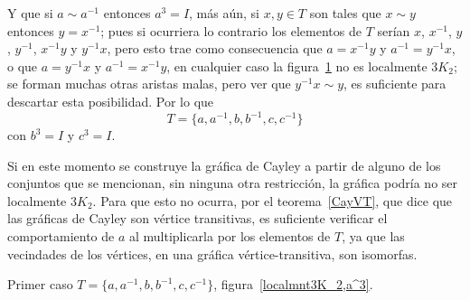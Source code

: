 \documentclass[12pt]{book}
\theoremstyle{definition}
\begin{document}
Y que si $a\sim a^{-1}$ entonces $a^3=I$, m\'as a\'un, si $x,y\in T$
son tales que $x\sim y$ entonces $y=x^{-1}$; pues si ocurriera lo
contrario los elementos de $T$ serían $x$, $x^{-1}$, $y$, $y^{-1}$,
$x^{-1}y$ y $y^{-1}x$, pero esto trae como consecuencia que $a=
x^{-1}y$ y $a^{-1}=y^{-1}x$, o que $a=y^{-1}x$ y $a^{-1}= x^{-1}y$, en
cualquier caso la figura~\ref{b=c,a^3} no es localmente $3K_2$; se
forman muchas otras aristas malas, pero ver que $y^{-1}x \sim y$, es
suficiente para descartar esta posibilidad. Por lo que
$$T=\{a,a^{-1},b,b^{-1},c, c^{-1}\}$$ con $b^3=I$ y $c^{3}=I$.



\begin{figure}
  \centering
  \caption{}\label{b=c,a^3}
\end{figure}

Si en este momento se construye la gráfica de Cayley a partir de
alguno de los conjuntos que se mencionan, sin ninguna otra
restricción, la gráfica podría no ser localmente $3K_2$. Para que esto
no ocurra, por el teorema~\ref{CayVT}, que dice que las gráficas de
Cayley son vértice transitivas, es suficiente verificar el
comportamiento de $a$ al multiplicarla por los elementos de $T$, ya
que las vecindades de los vértices, en una gráfica
vértice-transitiva, son isomorfas.

Primer caso $T=\{a, a^{-1},b,b^{-1},c,c^{-1}\}$,
figura~\ref{localmnt3K_2,a^3}.
\end{document}
